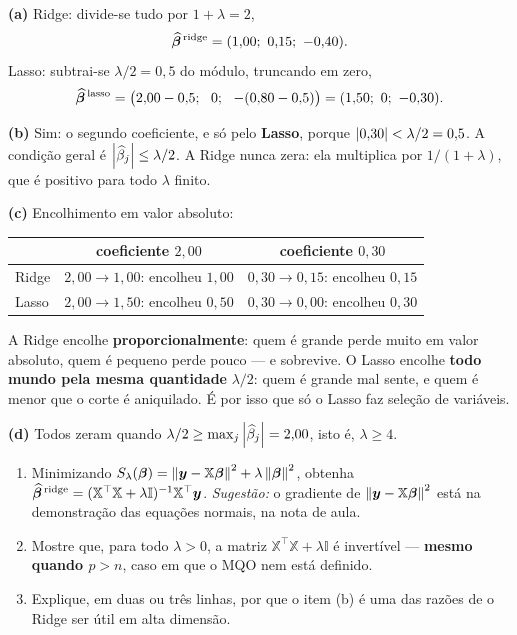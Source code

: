 \documentclass[11pt,a4paper]{article}
\begin{document}
\begin{solucao}
\textbf{(a)} Ridge: divide-se tudo por $1+\lambda=2$,
\[
  \widehat{\bm{\beta}}^{\,\text{ridge}} = (1{,}00;\ 0{,}15;\ -0{,}40).
\]
Lasso: subtrai-se $\lambda/2=0{,}5$ do módulo, truncando em zero,
\[
  \widehat{\bbeta}^{\,\text{lasso}}
   = \big(2{,}00-0{,}5;\ \ 0;\ \ -(0{,}80-0{,}5)\big) = (1{,}50;\ 0;\ -0{,}30).
\]

\smallskip
\textbf{(b)} Sim: o segundo coeficiente, e só pelo \textbf{Lasso}, porque
$\left\lvert 0{,}30 \right\rvert<\lambda/2=0{,}5$. A condição geral é
$\left\lvert \widehat\beta_j \right\rvert\le\lambda/2$. A Ridge nunca zera: ela multiplica por
$1/(1+\lambda)$, que é positivo para todo $\lambda$ finito.

\smallskip
\textbf{(c)} Encolhimento em valor absoluto:
\begin{center}\small
\begin{tabular}{@{}lcc@{}}
\toprule
                & coeficiente $2{,}00$ & coeficiente $0{,}30$ \\
\midrule
Ridge           & $2{,}00\to1{,}00$: encolheu $1{,}00$ & $0{,}30\to0{,}15$: encolheu $0{,}15$ \\
Lasso           & $2{,}00\to1{,}50$: encolheu $0{,}50$ & $0{,}30\to0{,}00$: encolheu $0{,}30$ \\
\bottomrule
\end{tabular}
\end{center}
A Ridge encolhe \textbf{proporcionalmente}: quem é grande perde muito em valor
absoluto, quem é pequeno perde pouco --- e sobrevive. O Lasso encolhe \textbf{todo
mundo pela mesma quantidade} $\lambda/2$: quem é grande mal sente, e quem é menor
que o corte é aniquilado. É por isso que só o Lasso faz seleção de variáveis.

\smallskip
\textbf{(d)} Todos zeram quando $\lambda/2\ge\max_j\left\lvert \widehat\beta_j \right\rvert=2{,}00$,
isto é, $\lambda\ge 4$.
\end{solucao}

\begin{exercicio}
\begin{enumerate}[label=(\alph*),leftmargin=1.1cm]
  \item Minimizando
        $S_\lambda(\bm{\beta})=\left\lVert \bm y-\mathbb{X}\bm{\beta} \right\rVert^2+\lambda\left\lVert \bm{\beta} \right\rVert^2$,
        obtenha
        $\widehat{\bm{\beta}}^{\,\text{ridge}}=(\mathbb{X}^\top\mathbb{X}+\lambda\mathbb{I})^{-1}\mathbb{X}^\top\bm y$.
        \emph{Sugestão:} o gradiente de $\left\lVert \bm y-\mathbb{X}\bm{\beta} \right\rVert^2$ está na
        demonstração das equações normais, na nota de aula.
  \item Mostre que, para todo $\lambda>0$, a matriz
        $\mathbb{X}^\top\mathbb{X}+\lambda\mathbb{I}$ é invertível --- \textbf{mesmo quando
        $p>n$}, caso em que o MQO nem está definido.
  \item Explique, em duas ou três linhas, por que o item (b) é uma das razões de o
        Ridge ser útil em alta dimensão.
\end{enumerate}
\end{exercicio}
\end{document}

